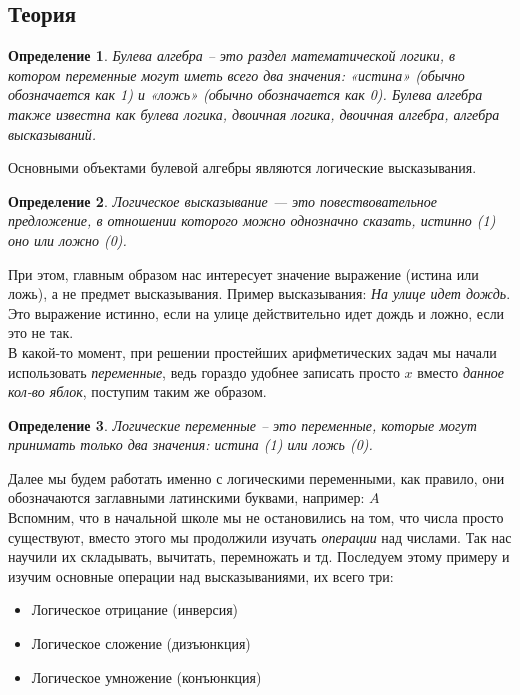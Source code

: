 \documentclass[12pt]{article}
\newtheorem{definition}{Определение}[section]
\theoremstyle{problem_style}
\begin{document}
\subsection{Теория}
\begin{definition}
Булева алгебра – это раздел математической логики, в котором переменные могут иметь всего два значения: «истина» (обычно обозначается как 1) и «ложь» (обычно обозначается как 0). Булева алгебра также известна как булева логика, двоичная логика, двоичная алгебра, алгебра высказываний.
\end{definition}
Основными объектами булевой алгебры являются логические высказывания.
\begin{definition}
Логическое высказывание — это повествовательное предложение, в отношении которого можно однозначно сказать, истинно (1) оно или ложно (0).
\end{definition}
При этом, главным образом нас интересует значение выражение (истина или ложь), а не предмет высказывания. Пример высказывания: \textit{На улице идет дождь}. Это выражение истинно, если на улице действительно идет дождь и ложно, если это не так.\\
В какой-то момент, при решении простейших арифметических задач мы начали использовать \textit{переменные}, ведь гораздо удобнее записать просто \(x\) вместо \textit{данное кол-во яблок}, поступим таким же образом. 
\begin{definition}
Логические переменные – это переменные, которые могут принимать только два значения: истина (1) или ложь (0).
\end{definition}
Далее мы будем работать именно с логическими переменными, как правило, они обозначаются заглавными латинскими буквами, например: \(A\)  \\
Вспомним, что в начальной школе мы не остановились на том, что числа просто существуют, вместо этого мы продолжили изучать \textit{операции} над числами. Так нас научили их складывать, вычитать, перемножать и тд. Последуем этому примеру и изучим основные операции над высказываниями, их всего три:
\begin{itemize}
    \item Логическое отрицание (инверсия)
    \item Логическое сложение (дизъюнкция)
    \item Логическое умножение (конъюнкция)
\end{itemize}
\end{document}
